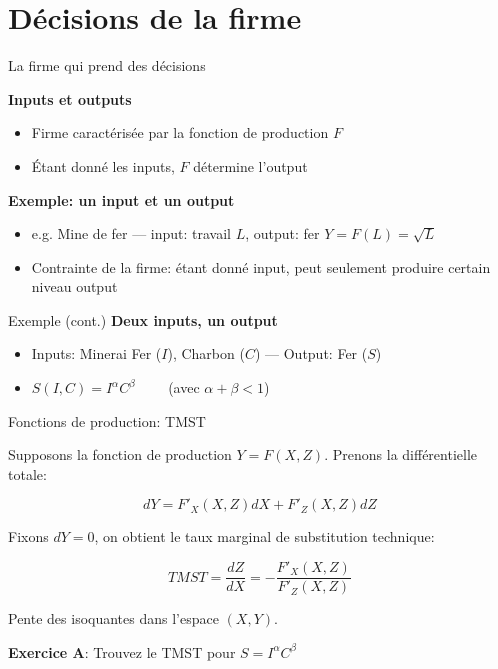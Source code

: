 \documentclass[handout]{beamer}
\newenvironment{iPar}[1]{\textbf{#1} \begin{itemize}}{\end{itemize}}
\newcommand{\mdp}{\medskip \pause}
\begin{document}
\section{Décisions de la firme}

\begin{frame}{La firme qui prend des décisions}

\begin{iPar}{Inputs et outputs} \item Firme caractérisée par la fonction de production $F$ \item Étant donné les inputs, $F$ détermine l'output
\end{iPar}\mdp \begin{iPar}{Exemple: un input et un output} \item  e.g.
Mine de fer ---  input: travail $L$, output: fer $Y = F(L) = \sqrt{L}$ \item Contrainte de la firme: étant donné input, peut seulement produire certain niveau output \end{iPar}

\end{frame}


\begin{frame}{Exemple (cont.)} \begin{iPar}{Deux inputs, un output}
\item Inputs: Minerai Fer ($I$), Charbon ($C$) --- Output: Fer ($S$) \medskip \item $S(I,C)  = I^{\alpha}C^{\beta}\quad \quad$ (avec $\alpha + \beta <1$) 
\end{iPar}
\end{frame}

\begin{frame}{Fonctions de production: TMST} 

Supposons la fonction de production $Y = F(X,Z)$. Prenons la différentielle totale: 

$$ dY = F'_X(X,Z)dX + F'_Z(X,Z)dZ $$

Fixons $dY = 0$, on obtient le taux marginal de substitution technique: 

$$ TMST = \frac{dZ}{dX} = -\frac{F'_X(X,Z)}{F'_Z(X,Z)} $$

Pente des isoquantes dans l'espace $(X,Y)$. 

\textbf{Exercice A}: Trouvez le TMST pour $S=I^{\alpha} C^{\beta}$
\end{frame}
\end{document}
